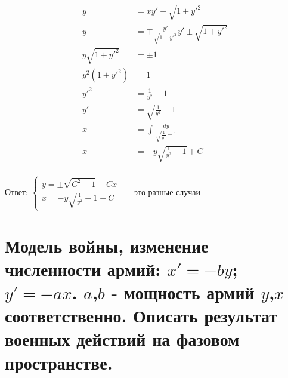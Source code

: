 \begin{align*}
    y                & = xy' \pm \sqrt{1 + y'^2}                              \\
    y                & = \mp \frac{y'}{\sqrt{1 + y'^2}}y' \pm \sqrt{1 + y'^2} \\
    y\sqrt{1 + y'^2} & = \pm 1                                                \\
    y^2(1 + y'^2)    & = 1                                                    \\
    y'^2             & = \frac{1}{y^2} - 1                                    \\
    y'               & = \sqrt{\frac{1}{y^2} - 1}                             \\
    x                & = \int\frac{dy}{\sqrt{\frac{1}{y^2} - 1}}              \\
    x                & = -y\sqrt{\frac{1}{y^2} - 1} + C                       \\
\end{align*}

Ответ: $\begin{cases}
        y = \pm\sqrt{C^2+1} + Cx \\
        x = -y\sqrt{\frac{1}{y^2} - 1} + C
    \end{cases}$ --- это разные случаи

\section{Модель войны, изменение численности армий: $x'=-by$; $y'=-ax$. $a$,$b$ - мощность армий $y$,$x$ соответственно. Описать результат военных действий на фазовом пространстве.}

